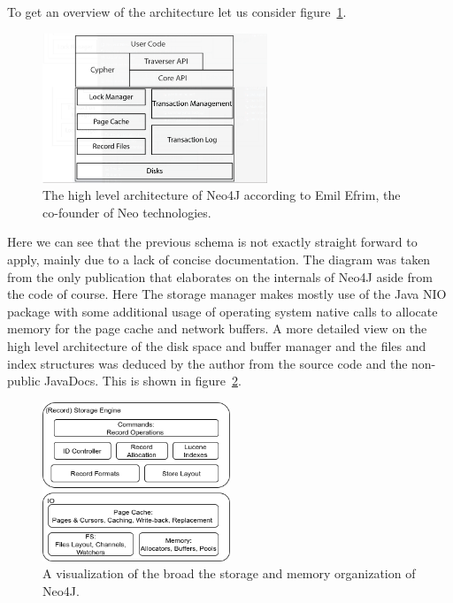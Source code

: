             To get an overview of the architecture let us consider figure~\ref{N4J_HLA_Emil}. 

            \begin{figure}[htp]\label{N4J_HLA_Emil}
            \begin{center}
            \includegraphics[keepaspectratio,width=0.6\textwidth]{img/00_intro/N4J_HLA_Emil.png}
            \end{center}
            \caption{The high level architecture of Neo4J according to Emil Efrim, the co-founder of Neo technologies.} %
            \end{figure}

            Here we can see that the previous schema is not exactly straight forward to apply, mainly due to a lack of concise documentation.
            The diagram was taken from the only publication that elaborates on the internals of Neo4J aside from the code of course.
            Here The storage manager makes mostly use of the Java NIO package with some additional usage of operating system native calls to allocate memory for the page cache and network buffers. 
            A more detailed view on the high level architecture of the disk space and buffer manager and the files and index structures was deduced by the author from the source code and the non-public JavaDocs.
            This is shown in figure~\ref{N4J_Storage}.

            \begin{figure}[htp]\label{N4J_Storage}
            \begin{center}
            \includegraphics[keepaspectratio,width=0.5\textwidth]{img/00_intro/N4J_Storage.png}
            \end{center}
            \caption{A visualization of the broad the storage and memory organization of Neo4J.} %
            \end{figure}

